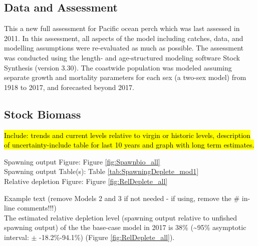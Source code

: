 \documentclass[12pt,]{article}
\begin{document}
\subsection*{Data and Assessment}\label{data-and-assessment}

This a new full assessment for Pacific ocean perch which was last
assessed in 2011. In this assessment, all aspects of the model including
catches, data, and modelling assumptions were re-evaluated as much as
possible. The assessment was conducted using the length- and
age-structured modeling software Stock Synthesis (version 3.30). The
coastwide population was modeled assuming separate growth and mortality
parameters for each sex (a two-sex model) from 1918 to 2017, and
forecasted beyond 2017.

\FloatBarrier

\subsection*{Stock Biomass}\label{stock-biomass}

\hl{Include: trends and current levels relative to virgin or historic levels, 
description of uncertainty-include table for last 10 years and graph with 
long term estimates.}

Spawning output Figure: Figure \ref{fig:Spawnbio_all}\\
Spawning output Table(s): Table \ref{tab:SpawningDeplete_mod1}\\
Relative depletion Figure: Figure \ref{fig:RelDeplete_all}

Example text (remove Models 2 and 3 if not needed - if using, remove the
\# in-line comments!!!)\\
The estimated relative depletion level (spawning output relative to
unfished spawning output) of the the base-case model in 2017 is 38\%
(\textasciitilde{}95\% asymptotic interval: \(\pm\) -18.2\%-94.1\%)
(Figure \ref{fig:RelDeplete_all}).

\FloatBarrier
\end{document}
